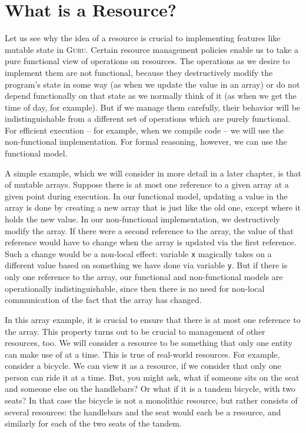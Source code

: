 \documentclass{book}[12pt]
\newcommand{\guru}[0]{\textsc{Guru}\xspace}
\begin{document}
\section{What is a Resource?}

Let us see why the idea of a resource is crucial to implementing
features like mutable state in \guru.  Certain resource management
policies enable us to take a pure functional view of operations on
resources.  The operations as we desire to implement them are not
functional, because they destructively modify the program's state in
some way (as when we update the value in an array) or do not depend
functionally on that state as we normally think of it (as when we get
the time of day, for example).  But if we manage them carefully, their
behavior will be indistinguishable from a different set of operations
which are purely functional.  For efficient execution -- for example,
when we compile code -- we will use the non-functional implementation.
For formal reasoning, however, we can use the functional model.

A simple example, which we will consider in more detail in a later
chapter, is that of mutable arrays.  Suppose there is at most one
reference to a given array at a given point during execution.  In our
functional model, updating a value in the array is done by creating a
new array that is just like the old one, except where it holds the new
value.  In our non-functional implementation, we destructively modify
the array.  If there were a second reference to the array, the value
of that reference would have to change when the array is updated via
the first reference.  Such a change would be a non-local effect:
variable \texttt{x} magically takes on a different value based on
something we have done via variable \texttt{y}.  But if there is only
one reference to the array, our functional and non-functional models
are operationally indistinguishable, since then there is no need for
non-local communication of the fact that the array has changed.

In this array example, it is crucial to ensure that there is at most
one reference to the array.  This property turns out to be crucial to
management of other resources, too.  We will consider a resource to be
something that only one entity can make use of at a time.  This is
true of real-world resources.  For example, consider a bicycle.  We
can view it as a resource, if we consider that only one person can
ride it at a time.  But, you might ask, what if someone sits on the
seat and someone else on the handlebars?  Or what if it is a tandem
bicycle, with two seats?  In that case the bicycle is not a monolithic
resource, but rather consists of several resources: the handlebars and
the seat would each be a resource, and similarly for each of the two
seats of the tandem.  
\end{document}
